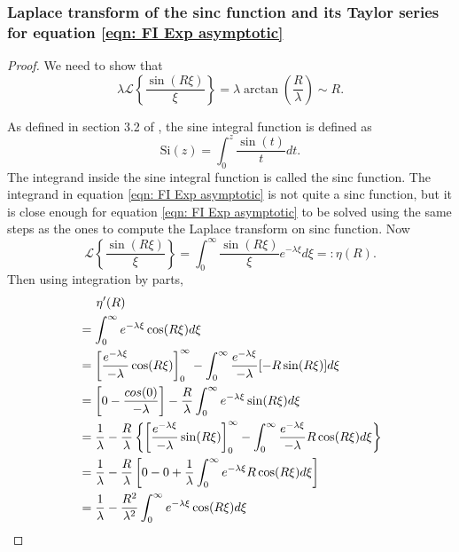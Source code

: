 \documentclass[%
 reprint,
 amsmath,amssymb,
 aps,
]{revtex4-2}
\begin{document}
\subsubsection{Laplace transform of the sinc function and its Taylor series for equation \eqref{eqn: FI Exp asymptotic}}
\begin{proof}
We need to show that
\begin{equation*}
    \lambda \mathcal{L}\left\{\frac{\sin(R\xi)}{\xi} \right\} = \lambda \arctan\left(\frac{R}{\lambda}\right) \sim R.
\end{equation*}

As defined in section 3.2 of \cite{rotiroti2022computing}, the sine integral function is defined as
\begin{equation*}
    \text{Si}(z) = \int_0^z \frac{\sin(t)}{t} dt.
\end{equation*}
The integrand inside the sine integral function is called the sinc function. The integrand in equation \eqref{eqn: FI Exp asymptotic} is not quite a sinc function, but it is close enough for equation \eqref{eqn: FI Exp asymptotic} to be solved using the same steps as the ones to compute the Laplace transform on sinc function. Now
\begin{equation} \label{eqn: Laplace transform eta function}
    \mathcal{L}\left\{\frac{\sin(R\xi)}{\xi}\right\} = \int_0^\infty \frac{\sin(R\xi)}{\xi} e^{-\lambda \xi} d\xi =: \eta(R).
\end{equation}
Then using integration by parts,
\begin{align*}
    & \hspace{0.5cm} \eta'(R) \\
    & = \int_0^\infty e^{-\lambda \xi} \cos(R\xi) d\xi\\
    & = \left[\frac{e^{-\lambda\xi}}{-\lambda}\cos(R\xi) \right]_0^\infty - \int_0^\infty \frac{e^{-\lambda\xi}}{-\lambda}[-R\sin(R\xi)]d\xi \\
    & = \left[0-\frac{cos(0)}{-\lambda} \right] - \frac{R}{\lambda}\int_0^\infty e^{-\lambda\xi}\sin(R\xi)d\xi\\
    & = \frac{1}{\lambda} - \frac{R}{\lambda}\left\{\left[\frac{e^{-\lambda\xi}}{-\lambda}\sin(R\xi) \right]_0^\infty - \int_0^\infty \frac{e^{-\lambda\xi}}{-\lambda}R\cos(R\xi)d\xi \right\}\\
    & = \frac{1}{\lambda} - \frac{R}{\lambda}\left[0 - 0 + \frac{1}{\lambda}\int_0^\infty e^{-\lambda\xi}R\cos(R\xi) d\xi \right] \\
    & = \frac{1}{\lambda} - \frac{R^2}{\lambda^2}\int_0^\infty e^{-\lambda\xi} \cos(R\xi) d\xi \\

\end{align*}
\end{proof}
\end{document}
